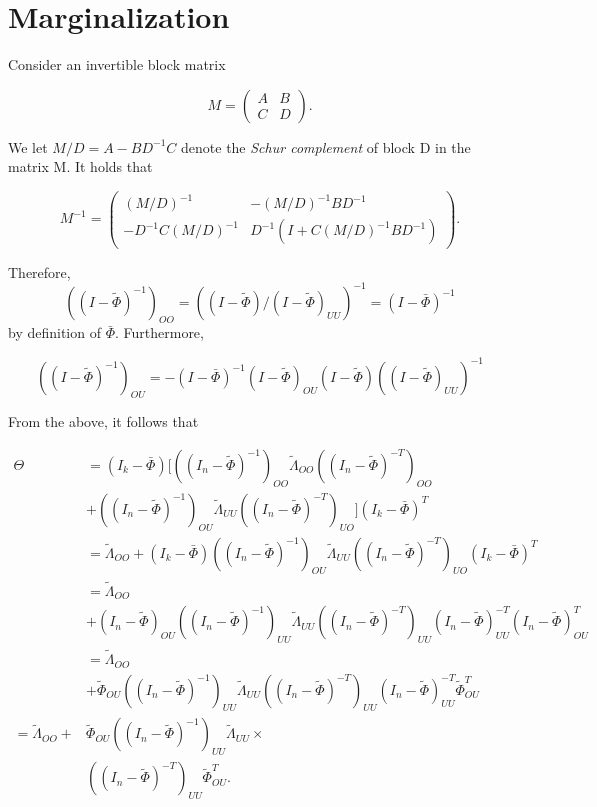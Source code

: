 \documentclass[accepted]{uai2021} %
\begin{document}
\appendix

\section{Marginalization}
\label{sec:marg}

Consider an invertible block matrix 

$$
M=
\begin{pmatrix}
A & B \\
C & D
\end{pmatrix}.
$$

We let $M / D = A - BD^{-1}C$ denote the \emph{Schur complement} of block D in 
the matrix M. It holds that

$$
M^{-1}=
\begin{pmatrix}
(M/D)^{-1} & -(M/D)^{-1}BD^{-1} \\
-D^{-1}C(M/D)^{-1} & D^{-1}(I + C(M/D)^{-1}BD^{-1})
\end{pmatrix}.
$$

Therefore, $$((I - \tilde{\Phi})^{-1})_{OO} = ((I - \tilde{\Phi})/(I - 
\tilde{\Phi})_{UU})^{-1} = (I- \bar{\Phi})^{-1}$$ by definition of 
$\bar{\Phi}$. 
Furthermore, 

$$
((I-\tilde{\Phi})^{-1})_{OU} = 
-(I-\bar{\Phi})^{-1}(I-\tilde{\Phi})_{OU}(I-\tilde{\Phi})((I-\tilde{\Phi})_{UU})^{-1}
$$

From the above, it follows that

\begin{align*}
\Theta & = (I_k - \bar{\Phi})[((I_n - 
\tilde{\Phi})^{-1})_{OO}\tilde{\Lambda}_{OO}((I_n - \tilde{\Phi})^{-T})_{OO} \\ 
& + 
((I_n 
- 
\tilde{\Phi})^{-1})_{OU}\tilde{\Lambda}_{UU}((I_n - 
\tilde{\Phi})^{-T})_{UO}](I_k - 
\bar{\Phi})^T \\
& = \tilde{\Lambda}_{OO} + (I_k - \bar{\Phi})((I_n 
- 
\tilde{\Phi})^{-1})_{OU}\tilde{\Lambda}_{UU}((I_n - 
\tilde{\Phi})^{-T})_{UO}(I_k - 
\bar{\Phi})^T \\
& = \tilde{\Lambda}_{OO} \\ & + (I_n - \tilde{\Phi})_{OU}((I_n - 
\tilde{\Phi})^{-1})_{UU}\tilde{\Lambda}_{UU}((I_n - 
\tilde{\Phi})^{-T})_{UU}(I_n - 
\tilde{\Phi})_{UU}^{-T}(I_n - 
\tilde{\Phi})_{OU}^T \\
& = \tilde{\Lambda}_{OO} \\ & + \tilde{\Phi}_{OU}((I_n - 
\tilde{\Phi})^{-1})_{UU}\tilde{\Lambda}_{UU}((I_n - 
\tilde{\Phi})^{-T})_{UU}(I_n - 
\tilde{\Phi})_{UU}^{-T} 
\tilde{\Phi}_{OU}^T \\
= \tilde{\Lambda}_{OO} + & \tilde{\Phi}_{OU}((I_n - 
\tilde{\Phi})^{-1})_{UU}\tilde{\Lambda}_{UU} \times  \\ & ((I_n - 
\tilde{\Phi})^{-T})_{UU}
\tilde{\Phi}_{OU}^T.
\end{align*}



\end{document}
